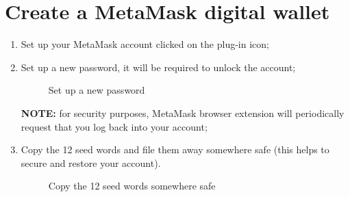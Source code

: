 \documentclass[ManualeUtente.tex]{subfiles}
\begin{document}
\section{Create a MetaMask digital wallet}
\begin{enumerate}	
	\item Set up your MetaMask account clicked on the plug-in icon;
	\item Set up a new password, it will be required to unlock the account;
	\begin{figure}[H]
		\centering
		\caption{Set up a new password}
		\label{fig:Set up a new password}
	\end{figure}
	\textbf{NOTE:} for security purposes, MetaMask browser extension will periodically request that you log back into your account;
	\item Copy the 12 seed words and file them away somewhere safe (this helps to secure and restore your account).
	\begin{figure}[H]
		\centering
		\caption{Copy the 12 seed words somewhere safe}
		\label{fig:Copy the 12 seed words somewhere safe}
	\end{figure}
\end{enumerate}
\end{document}
